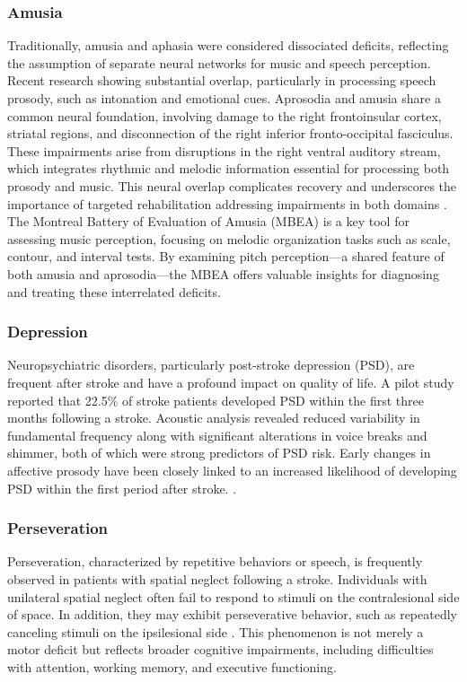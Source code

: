 \subsubsection{Amusia}
Traditionally, amusia and aphasia were considered dissociated deficits, reflecting the assumption of separate neural networks for music and speech perception. Recent research showing substantial overlap, particularly in processing speech prosody, such as intonation and emotional cues.
Aprosodia and amusia share a common neural foundation, involving damage to the right frontoinsular cortex, striatal regions, and disconnection of the right inferior fronto-occipital fasciculus. These impairments arise from disruptions in the right ventral auditory stream, which integrates rhythmic and melodic information essential for processing both prosody and music. This neural overlap complicates recovery and underscores the importance of targeted rehabilitation addressing impairments in both domains \cite{sihvonen_right_2022, hausen_music_2013}. The Montreal Battery of Evaluation of Amusia (MBEA) \cite{peretz_i_champod_as_and_hyde_k_varieties_2003} is a key tool for assessing music perception, focusing on melodic organization tasks such as scale, contour, and interval tests. By examining pitch perception—a shared feature of both amusia and aprosodia—the MBEA offers valuable insights for diagnosing and treating these interrelated deficits.
\subsubsection{Depression}
Neuropsychiatric disorders, particularly post-stroke depression (PSD), are frequent after stroke and have a profound impact on quality of life. A pilot study reported that 22.5\% of stroke patients developed PSD within the first three months following a stroke. Acoustic analysis revealed reduced variability in fundamental frequency along with significant alterations in voice breaks and shimmer, both of which were strong predictors of PSD risk. Early changes in affective prosody have been closely linked to an increased likelihood of developing PSD within the first period after stroke. \cite{villain_affective_2016}. 
\subsubsection{Perseveration}
Perseveration, characterized by repetitive behaviors or speech, is frequently observed in patients with spatial neglect following a stroke. Individuals with unilateral spatial neglect often fail to respond to stimuli on the contralesional side of space. In addition, they may exhibit perseverative behavior, such as repeatedly canceling stimuli on the ipsilesional side \cite{pia_drawing_2013}. This phenomenon is not merely a motor deficit but reflects broader cognitive impairments, including difficulties with attention, working memory, and executive functioning.

